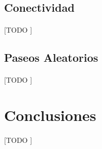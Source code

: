 \documentclass{subfiles}
\begin{document}
      \subsection{Conectividad}
      \label{sec:graph_connectiviy}

        \paragraph{}
        [TODO ]

      \subsection{Paseos Aleatorios}
      \label{sec:random_walks}

        \paragraph{}
        [TODO ]

    \section{Conclusiones}
    \label{sec:graphs_conclusions}

      \paragraph{}
      [TODO ]
\end{document}

